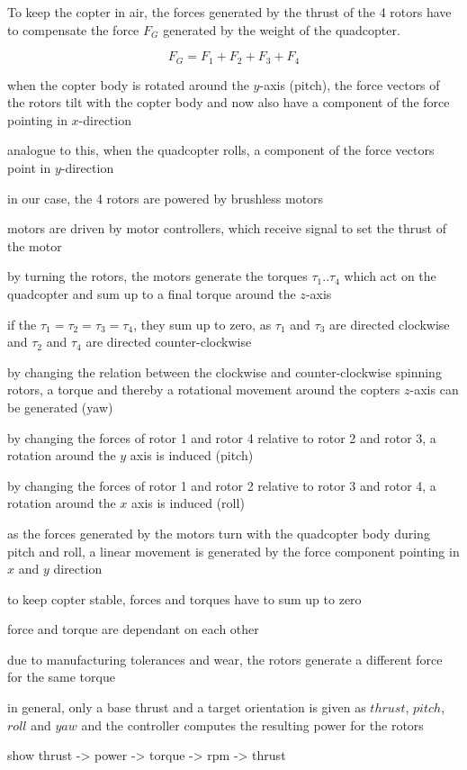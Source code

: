 To keep the copter in air, the forces generated by the thrust of the 4 rotors have to compensate the force $F_{G}$ generated by the weight of the quadcopter.


\begin{equation}
F_G = F_1 + F_2 +F_3 + F_4
\end{equation}

\par{when the copter body is rotated around the $y$-axis (pitch), the force vectors of the rotors tilt with the copter body and now also have a component of the force pointing in $x$-direction}
\par{analogue to this, when the quadcopter rolls, a component of the force vectors point in $y$-direction}
\par{in our case, the 4 rotors are powered by brushless motors}
\par{motors are driven by motor controllers, which receive  signal to set the thrust of the motor}

\par{by turning the rotors, the motors generate the torques $\tau_1 .. \tau_4$ which act on the quadcopter and sum up to  a final torque around the $z$-axis}
\par{if the $\tau_1 = \tau_2 = \tau_3= \tau_4$, they sum up to zero, as $\tau_1$ and $\tau_3$ are directed clockwise and $\tau_2$ and $\tau_4$ are directed counter-clockwise}
\par{by changing the relation between the clockwise and counter-clockwise spinning rotors, a torque and thereby a rotational movement around the copters $z$-axis can be generated (yaw)}
\par{by changing the forces of rotor 1 and rotor 4 relative to rotor 2 and rotor 3, a rotation around the $y$ axis is induced (pitch)}
\par{by changing the forces of rotor 1 and rotor 2 relative to rotor 3 and rotor 4, a rotation around the $x$ axis is induced (roll)}
\par{as the forces generated by the motors turn with the quadcopter body during pitch and roll, a linear movement is generated by the force component pointing in $x$ and $y$ direction}
\par{to keep copter stable,  forces and torques have to sum up to zero}
\par{force and torque are dependant on each other}
\par{due to manufacturing tolerances and wear, the rotors generate a different force for the same torque}
\par{in general, only a base thrust and a target orientation is given as $thrust$, $pitch$, $roll$ and $yaw$ and the controller computes the resulting power for the rotors}
\par{ show thrust -> power -> torque -> rpm -> thrust}


